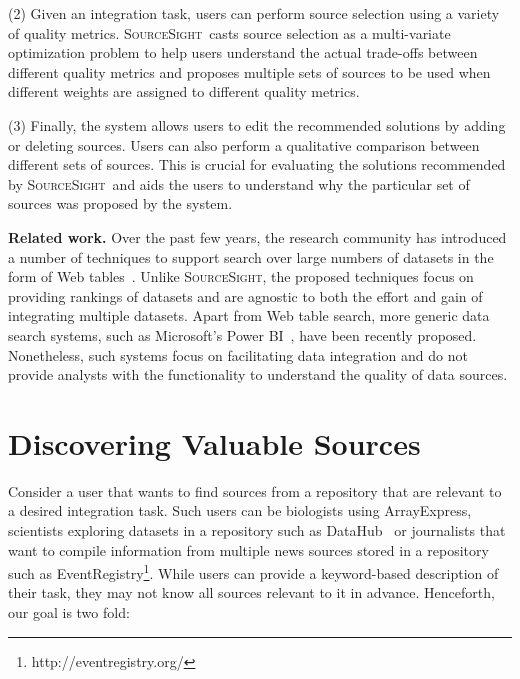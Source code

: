 \documentclass{vldb}
\newcommand\system{\textsc{SourceSight}}
\begin{document}
\vspace{2pt}\noindent (2) Given an integration task, users can perform source selection using a variety of quality metrics. \system~casts source selection as a multi-variate optimization problem to help users understand the actual trade-offs between different quality metrics and proposes multiple sets of sources to be used when different weights are assigned to different quality metrics. 

\vspace{2pt}\noindent (3) Finally, the system allows users to edit the recommended solutions by adding or deleting sources. Users can also perform a qualitative comparison between different sets of sources. This is crucial for evaluating the solutions recommended by \system~and aids the users to understand why the particular set of sources was proposed by the system.

\noindent\textbf{Related work.} Over the past few years, the research community has introduced a number of techniques to support search over large numbers of datasets in the form of Web tables~\cite{limaye:2010,dassarma:2012,yakout:2012}. Unlike \system, the proposed techniques focus on providing rankings of datasets and are agnostic to both the effort and gain of integrating multiple datasets. Apart from Web table search, more generic data search systems, such as Microsoft's Power BI~\cite{powerbi}, have been recently proposed. Nonetheless, such systems focus on facilitating data integration and do not provide analysts with the functionality to understand the quality of data sources.


\section{Discovering Valuable Sources}
\label{sec:sources}
Consider a user that wants to find sources from a repository that are relevant to a desired integration task. Such users can be biologists using ArrayExpress, scientists exploring datasets in a repository such as DataHub~\cite{datahub} or journalists that want to compile information from multiple news sources stored in a repository such as EventRegistry\footnote{http://eventregistry.org/}. While users can provide a keyword-based description of their task, they may not know all sources relevant to it in advance. Henceforth, our goal is two fold: 
\end{document}
